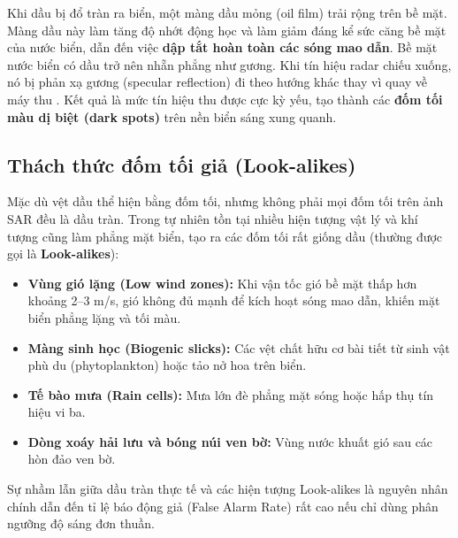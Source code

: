 Khi dầu bị đổ tràn ra biển, một màng dầu mỏng (oil film) trải rộng trên bề mặt. Màng dầu này làm tăng độ nhớt động học và làm giảm đáng kể sức căng bề mặt của nước biển, dẫn đến việc \textbf{dập tắt hoàn toàn các sóng mao dẫn}. Bề mặt nước biển có dầu trở nên nhẵn phẳng như gương. Khi tín hiệu radar chiếu xuống, nó bị phản xạ gương (specular reflection) đi theo hướng khác thay vì quay về máy thu \cite{topouzelis2008oil}. Kết quả là mức tín hiệu thu được cực kỳ yếu, tạo thành các \textbf{đốm tối màu dị biệt (dark spots)} trên nền biển sáng xung quanh.

\subsection{Thách thức đốm tối giả (Look-alikes)}
Mặc dù vệt dầu thể hiện bằng đốm tối, nhưng không phải mọi đốm tối trên ảnh SAR đều là dầu tràn. Trong tự nhiên tồn tại nhiều hiện tượng vật lý và khí tượng cũng làm phẳng mặt biển, tạo ra các đốm tối rất giống dầu (thường được gọi là \textbf{Look-alikes}):
\begin{itemize}
    \item \textbf{Vùng gió lặng (Low wind zones):} Khi vận tốc gió bề mặt thấp hơn khoảng 2--3 m/s, gió không đủ mạnh để kích hoạt sóng mao dẫn, khiến mặt biển phẳng lặng và tối màu.
    \item \textbf{Màng sinh học (Biogenic slicks):} Các vệt chất hữu cơ bài tiết từ sinh vật phù du (phytoplankton) hoặc tảo nở hoa trên biển.
    \item \textbf{Tế bào mưa (Rain cells):} Mưa lớn đè phẳng mặt sóng hoặc hấp thụ tín hiệu vi ba.
    \item \textbf{Dòng xoáy hải lưu và bóng núi ven bờ:} Vùng nước khuất gió sau các hòn đảo ven bờ.
\end{itemize}
Sự nhầm lẫn giữa dầu tràn thực tế và các hiện tượng Look-alikes là nguyên nhân chính dẫn đến tỉ lệ báo động giả (False Alarm Rate) rất cao nếu chỉ dùng phân ngưỡng độ sáng đơn thuần.

